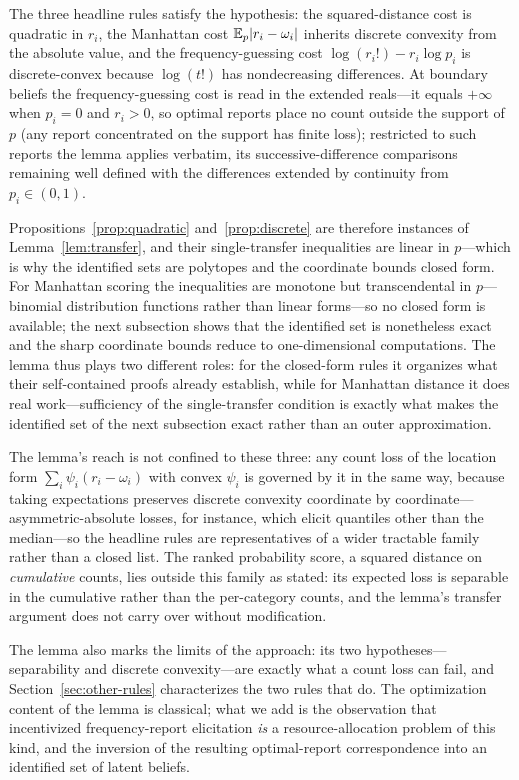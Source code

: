 The three headline rules satisfy the hypothesis: the squared-distance cost is quadratic in \(r_i\), the Manhattan cost \(\mathbb{E}_p|r_i-\omega_i|\) inherits discrete convexity from the absolute value, and the frequency-guessing cost \(\log(r_i!)-r_i\log p_i\) is discrete-convex because \(\log(t!)\) has nondecreasing differences.
At boundary beliefs the frequency-guessing cost is read in the extended reals---it equals \(+\infty\) when \(p_i=0\) and \(r_i>0\), so optimal reports place no count outside the support of \(p\) (any report concentrated on the support has finite loss); restricted to such reports the lemma applies verbatim, its successive-difference comparisons remaining well defined with the differences extended by continuity from \(p_i\in(0,1)\).

Propositions~\ref{prop:quadratic} and~\ref{prop:discrete} are therefore instances of Lemma~\ref{lem:transfer}, and their single-transfer inequalities are linear in \(p\)---which is why the identified sets are polytopes and the coordinate bounds closed form.
For Manhattan scoring the inequalities are monotone but transcendental in \(p\)---binomial distribution functions rather than linear forms---so no closed form is available; the next subsection shows that the identified set is nonetheless exact and the sharp coordinate bounds reduce to one-dimensional computations.
The lemma thus plays two different roles: for the closed-form rules it organizes what their self-contained proofs already establish, while for Manhattan distance it does real work---sufficiency of the single-transfer condition is exactly what makes the identified set of the next subsection exact rather than an outer approximation.

The lemma's reach is not confined to these three: any count loss of the location form \(\sum_i\psi_i(r_i-\omega_i)\) with convex \(\psi_i\) is governed by it in the same way, because taking expectations preserves discrete convexity coordinate by coordinate---asymmetric-absolute losses, for instance, which elicit quantiles other than the median---so the headline rules are representatives of a wider tractable family rather than a closed list.
The ranked probability score, a squared distance on \emph{cumulative} counts, lies outside this family as stated: its expected loss is separable in the cumulative rather than the per-category counts, and the lemma's transfer argument does not carry over without modification.

The lemma also marks the limits of the approach: its two hypotheses---separability and discrete convexity---are exactly what a count loss can fail, and Section~\ref{sec:other-rules} characterizes the two rules that do.
The optimization content of the lemma is classical; what we add is the observation that incentivized frequency-report elicitation \emph{is} a resource-allocation problem of this kind, and the inversion of the resulting optimal-report correspondence into an identified set of latent beliefs.

